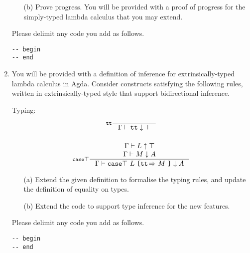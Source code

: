 \documentclass{examhons2018}
\begin{document}
\begin{enumerate}
\begin{enumerate}
\item[(b)] Prove progress. You will be provided with a proof of progress for
           the simply-typed lambda calculus that you may extend.
\end{enumerate}

Please delimit any code you add as follows.
\begin{verbatim}
-- begin
-- end
\end{verbatim}

\newpage

\item \rubricqC

\newcommand{\TT}{\texttt{tt}}
\newcommand{\CASETOP}{{\texttt{case}\top}}
\newcommand{\casetop}[2]{\CASETOP~#1~{\texttt{[tt}\!\Rightarrow}~#2~\texttt{]}}
\newcommand{\up}{\uparrow}
\newcommand{\dn}{\downarrow}

You will be provided with a definition of inference for extrinsically-typed lambda
calculus in Agda. Consider constructs satisfying the following rules,
written in extrinsically-typed style that support bidirectional inference.

Typing:
\begin{gather*}
\inference[$\TT$]
  {}
  {\Gamma \vdash \TT \dn \top}
\\~\\
\inference[$\CASETOP$]
  {\Gamma \vdash L \up \top \\
   \Gamma \vdash M \dn A}
  {\Gamma \vdash \casetop{L}{M} \dn A} 
\end{gather*}

\begin{enumerate}
\item[(a)] Extend the given definition to formalise the typing rules,
      and update the definition of equality on types.

\item[(b)] Extend the code to support type inference for the new features.
\end{enumerate}

Please delimit any code you add as follows.
\begin{verbatim}
-- begin
-- end
\end{verbatim}

\end{enumerate}

%
%
\end{document}
